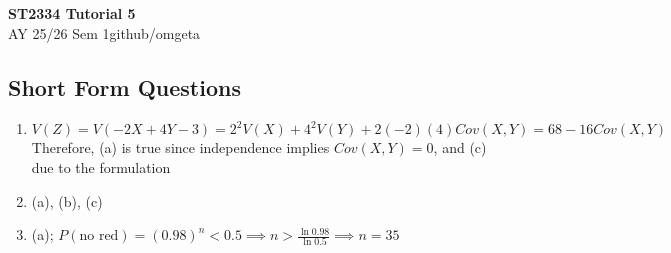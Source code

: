 \documentclass[12pt, a4paper]{article}
\newcommand{\mytitle}{ST2334 Tutorial 5}
\newcommand{\myauthor}{github/omgeta}
\newcommand{\mydate}{AY 25/26 Sem 1}
\begin{document}
\raggedright
\footnotesize
\begin{center}
{\normalsize{\textbf{\mytitle}}} \\
{\footnotesize{\mydate\hspace{2pt}\textemdash\hspace{2pt}\myauthor}}
\end{center}
\subsection*{Short Form Questions}
\begin{enumerate}[Q\arabic*.]
  \item $V(Z) = V(-2X+4Y-3) = 2^2V(X) + 4^2V(Y) + 2(-2)(4)Cov(X, Y) = 68 -16Cov(X,Y)$
    Therefore, (a) is true since independence implies $Cov(X,Y) = 0$, and (c) due to the formulation

  \item (a), (b), (c)


  \item (a); $P(\text{no red}) = (0.98)^n < 0.5 \implies n > \frac{\ln 0.98}{\ln 0.5} \implies n = 35$
\end{enumerate}
\end{document}
